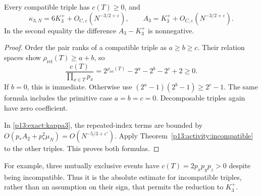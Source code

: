 \begin{proposition}
\label{p13:activity:kappa3}
Every compatible triple has \(c(T)\ge0\), and
\begin{equation}
 \kappa_{3,N}=6K_3^++O_{C,\varepsilon}(N^{-3/2+\varepsilon}),
 \qquad
 A_3=K_3^++O_{C,\varepsilon}(N^{-3/2+\varepsilon}).
 \label{p13:activity:kappa-comparison}
\end{equation}
In the second equality the difference \(A_3-K_3^+\)
is nonnegative.
\end{proposition}

\begin{proof}
Order the pair ranks of a compatible triple as
\(a\ge b\ge c\). Their relation spaces show
\(\rho_{\mathrm{rel}}(T)\ge a+b\), so
\[
 \frac{c(T)}{\prod_{x\in T}p_x}
  =2^{\rho_{\mathrm{rel}}(T)}-2^a-2^b-2^c+2\ge0.
\]
If \(b=0\), this is immediate. Otherwise use
\((2^a-1)(2^b-1)\ge2^c-1\).
The same formula includes the primitive case \(a=b=c=0\).
Decomposable triples again have zero coefficient.

In \eqref{p13:exact:kappa3}, the repeated-index terms
are bounded by \(O(p_*A_2+p_*^2\mu_N)
=O(N^{-5/3+\varepsilon'})\).
Apply Theorem~\ref{p13:activity:incompatible} to the
other triples. This proves both formulas.
\end{proof}

For example, three mutually exclusive events have
\(c(T)=2p_xp_yp_z>0\) despite being incompatible.
Thus it is the absolute estimate for incompatible
triples, rather than an assumption on their sign,
that permits the reduction to \(K_3^+\).
